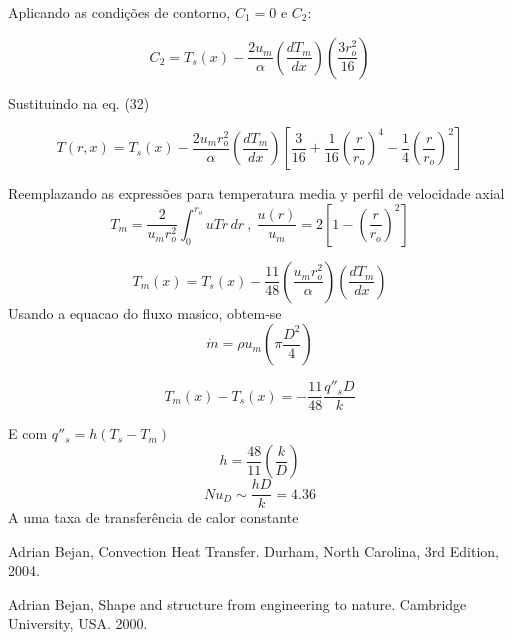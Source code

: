 \documentclass[12pt]{article}
\begin{document}
Aplicando as condições de contorno, $C_{1} = 0$ e $C_{2}$:


\begin{equation}
	C_2 = T_s(x) - \frac{2 u_m}{\alpha} \left( \frac{d T_m}{d x} \right) \left( \frac{3 r_o^2}{16} \right)
\end{equation}

Sustituindo na eq. (32)

\begin{equation}
	T(r, x) = T_s(x) - \frac{2 u_m r_o^2}{\alpha} \left( \frac{d T_m}{d x} \right) \left[ \frac{3}{16} + \frac{1}{16} \left( \frac{r}{r_o} \right)^4 - \frac{1}{4} \left( \frac{r}{r_o} \right)^2 \right]
\end{equation}

Reemplazando as expressões para temperatura media y perfil de velocidade axial
\begin{equation}
	T_m = \frac{2}{u_m r_o^2} \int_0^{r_o} u T r \, dr \ , \ \frac{u(r)}{u_m} = 2 \left[ 1 - \left( \frac{r}{r_o} \right)^2 \right]
\end{equation}

\begin{equation}
	T_m(x) = T_s(x) - \frac{11}{48} \left( \frac{u_m r_o^2}{\alpha} \right) \left( \frac{d T_m}{d x} \right)
\end{equation}
 Usando a equacao do fluxo masico, obtem-se
 \begin{equation}
 	\dot{m} = \rho u_m \left( \pi \frac{D^2}{4} \right)
 \end{equation}
 
 \begin{equation}
 	T_m(x) - T_s(x) = - \frac{11}{48} \frac{q''_s D}{k}
 \end{equation}
 
E com $q''_s = h (T_s - T_m)$
\begin{equation}
	h = \frac{48}{11} \left( \frac{k}{D} \right)
\end{equation}
\begin{equation}
	Nu_D \sim \frac{hD}{k} = 4.36
\end{equation}
A uma taxa de transferência de calor constante

\begin{thebibliography}{999}
	
	Adrian Bejan,
	Convection Heat Transfer.
	Durham, North Carolina,
	3rd Edition,
	2004.
	
	Adrian Bejan,
	Shape and structure from engineering to nature.
	Cambridge University, USA.
	2000.
	
\end{thebibliography}
\end{document}
